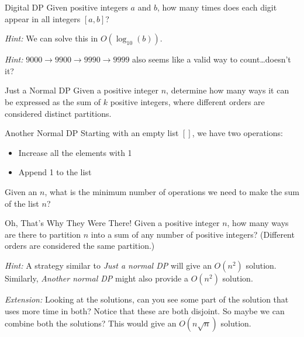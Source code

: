 \documentclass{beamer}
\begin{document}
\begin{frame}{Digital DP}
Given positive integers $a$ and $b$, how many times does each digit appear in all integers $[a, b]$?

\medskip
\textit{Hint:} We can solve this in $O(\log_{10}(b))$.

\medskip
\textit{Hint:} $9000 \to 9900 \to 9990 \to 9999$ also seems like a valid way to count\ldots doesn't it?
\end{frame}

\begin{frame}{}
\end{frame}
\begin{frame}{}
\end{frame}

\begin{frame}{Just a Normal DP}
Given a positive integer $n$, determine how many ways it can be expressed as the sum of $k$ positive integers, where different orders are considered distinct partitions.
\end{frame}

\begin{frame}{}
\end{frame}
\begin{frame}{}
\end{frame}

\begin{frame}{Another Normal DP}
Starting with an empty list $[]$, we have two operations:
\begin{itemize}
  \item Increase all the elements with 1
  \item Append 1 to the list
\end{itemize}
Given an $n$, what is the minimum number of operations we need to make the sum of the list $n$?
\end{frame}

\begin{frame}{}
\end{frame}
\begin{frame}{}
\end{frame}

\begin{frame}{Oh, That's Why They Were There!}
Given a positive integer $n$, how many ways are there to partition $n$ into a sum of any number of positive integers? (Different orders are considered the same partition.)

\medskip
\textit{Hint:} A strategy similar to \textit{Just a normal DP} will give an $O(n^2)$ solution. Similarly, \textit{Another normal DP} might also provide a $O(n^2)$ solution.

\medskip
\textit{Extension:} Looking at the solutions, can you see some part of the solution that uses more time in both? Notice that these are both disjoint. So maybe we can combine both the solutions? This would give an $O(n\sqrt{n})$ solution.
\end{frame}
\end{document}
